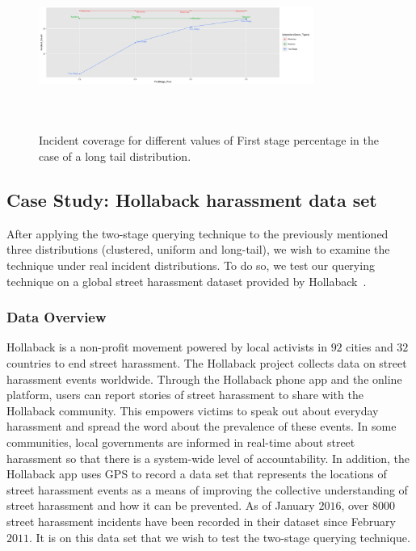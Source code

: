 \documentclass{acm_proc_article-sp}
\begin{document}
\begin{figure}[!h]
\centering
\includegraphics[width=9cm ,height=5.5cm]{figuresPng/LT-incidCov.png}
\caption{Incident coverage for different values of First stage percentage in the case of a long tail distribution. }
\label{fig:LTIncdCove}
\end{figure}
\subsection{Case Study: Hollaback harassment data set}
After applying the two-stage querying technique to the previously mentioned three distributions (clustered, uniform and long-tail), we wish to examine the technique under real incident distributions. To do so, we test our querying technique on a global street harassment dataset provided by Hollaback~\cite{hollaback}.
\subsubsection{Data Overview}
Hollaback is a non-profit movement powered by local activists in $92$ cities and $32$ countries to end street harassment. The Hollaback project collects data on street harassment events worldwide. Through the Hollaback phone app and the online platform, users can report stories of street harassment to share with the Hollaback community. This empowers victims to speak out about everyday harassment and spread the word about the prevalence of these events. In some communities, local governments are informed in real-time about street harassment so that there is a system-wide level of accountability. In addition, the Hollaback app uses GPS to record a data set that represents the locations of street harassment events as a means of improving the collective understanding of street harassment and how it can be prevented.  As of January $2016$, over $8000$ street harassment incidents have been recorded in their dataset since February $2011$.  It is on this data set that we wish to test the two-stage querying technique.\par
\end{document}
